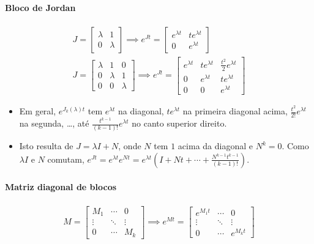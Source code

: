 \documentclass{article}
\begin{document}
\paragraph{Bloco de Jordan}

\begin{gather*}
J =
\begin{bmatrix}
\lambda & 1 \\
0 & \lambda
\end{bmatrix}
\implies
e^{Jt} =
\begin{bmatrix}
e^{\lambda t} & t e^{\lambda t} \\
0 & e^{\lambda t}
\end{bmatrix}
\\[1ex]
J =
\begin{bmatrix}
\lambda & 1 & 0 \\
0 & \lambda & 1 \\
0 & 0 & \lambda
\end{bmatrix}
\implies
e^{Jt} =
\begin{bmatrix}
e^{\lambda t} & t e^{\lambda t} & \frac{t^2}{2} e^{\lambda t} \\
0 & e^{\lambda t} & t e^{\lambda t} \\
0 & 0 & e^{\lambda t}
\end{bmatrix}
\end{gather*}

\begin{itemize}
    \item Em geral, $e^{J_k(\lambda) t}$ tem $e^{\lambda t}$ na diagonal, $t e^{\lambda t}$ na primeira
    diagonal acima, $\frac{t^2}{2!} e^{\lambda t}$ na segunda, \ldots, até $\frac{t^{k-1}}{(k-1)!} e^{\lambda t}$
    no canto superior direito.
    \item Isto resulta de $J = \lambda I + N$, onde $N$ tem $1$ acima da diagonal e $N^k = 0$. Como $\lambda I$
    e $N$ comutam, $e^{Jt} = e^{\lambda t} e^{Nt} = e^{\lambda t} \left( I + Nt + \cdots
    + \frac{N^{k-1} t^{k-1}}{(k-1)!} \right)$.
\end{itemize}

\paragraph{Matriz diagonal de blocos}

\begin{gather*}
M =
\begin{bmatrix}
M_1 & \cdots & 0 \\
\vdots & \ddots & \vdots \\
0 & \cdots & M_k
\end{bmatrix}
\implies
e^{Mt} =
\begin{bmatrix}
e^{M_1 t} & \cdots & 0 \\
\vdots & \ddots & \vdots \\
0 & \cdots & e^{M_k t}
\end{bmatrix}
\end{gather*}
\end{document}
